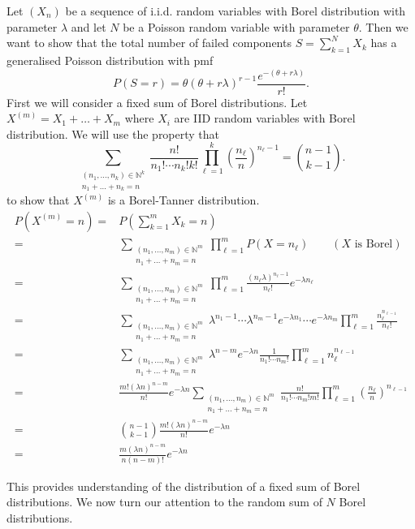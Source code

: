 \documentclass{article}
\begin{document}
Let $(X_n)$ be a sequence of i.i.d. random variables with Borel distribution with parameter $\lambda$ and let $N$ be a Poisson random variable with parameter $\theta$. Then we want to show that the total number of failed components $S=\sum_{k=1}^{N}X_k$ has a generalised Poisson distribution with pmf
\[P(S=r) = \theta(\theta + r\lambda)^{r-1} \frac{e^{-(\theta+r\lambda)}}{r!}.\]
First we will consider a fixed sum of Borel distributions. Let $X^{(m)}= X_1+\dots+X_m$ where $X_i$ are IID random variables with Borel distribution. We will use the property that 
\[\sum_{\substack{(n_1,\dots,n_k)\in \mathbb{N}^k\\ n_1+\dots+n_k=n}} \frac{n!}{n_1!\cdots n_k! k!} \prod_{\ell=1}^{k} \left(\frac{n_\ell}{n}\right)^{n_\ell-1} = {n-1\choose k-1}.\]
to show that $X^{(m)}$ is a Borel-Tanner distribution.
\[\begin{aligned}
P(X^{(m)}=n) =&  P \left( \sum_{k=1}^{m} X_k=n \right)\\
=& \sum_{\substack{(n_1,\dots,n_m)\in \mathbb{N}^m\\ n_1+\dots+n_m=n}} \prod_{\ell=1}^{m} P(X=n_\ell) \qquad (X \text{ is Borel})\\
=& \sum_{\substack{(n_1,\dots,n_m)\in \mathbb{N}^m\\ n_1+\dots+n_m=n}} \prod_{\ell=1}^{m} \frac{(n_\ell\lambda)^{n_\ell-1}}{n_\ell!}e^{-\lambda n_\ell} \\
=& \sum_{\substack{(n_1,\dots,n_m)\in \mathbb{N}^m\\ n_1+\dots+n_m=n}} \lambda^{n_1-1}\cdots\lambda^{n_m-1}e^{-\lambda n_1}\cdots e^{-\lambda n_m} \prod_{\ell=1}^{m} \frac{n_\ell^{n_{\ell-1}}}{n_\ell!}\\
=& \sum_{\substack{(n_1,\dots,n_m)\in \mathbb{N}^m\\ n_1+\dots+n_m=n}} \lambda^{n-m} e^{-\lambda n} \frac{1}{n_1!\cdots n_m!} \prod_{\ell=1}^{m} n_\ell^{n_{\ell-1}}\\
=& \frac{m! (\lambda n)^{n-m}}{n!}e^{-\lambda n} \sum_{\substack{(n_1,\dots,n_m)\in \mathbb{N}^m\\ n_1+\dots+n_m=n}} \frac{n!}{n_1!\cdots n_m!m!}  \prod_{\ell=1}^{m} \left(\frac{n_\ell}{n}\right)^{n_{\ell-1}}\\
=&{n-1\choose k-1} \frac{m! (\lambda n)^{n-m}}{n!} e^{-\lambda n}\\
=& \frac{m(\lambda n)^{n-m}}{n(n-m)!}e^{-\lambda n}
\end{aligned} \]

This provides understanding of the distribution of a fixed sum of Borel distributions. We now turn our attention to the random sum of $N$ Borel distributions.
\end{document}
